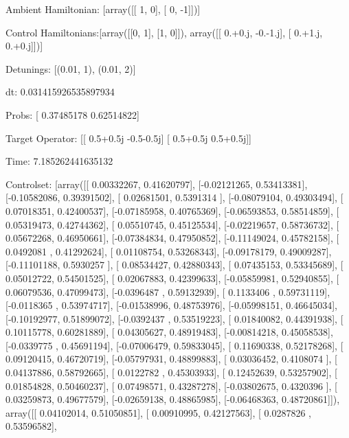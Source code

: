 \documentclass{article}
\begin{document}
    

\newpage

Ambient Hamiltonian: [array([[ 1,  0],
       [ 0, -1]])]

Control Hamiltonians:[array([[0, 1],
       [1, 0]]), array([[ 0.+0.j, -0.-1.j],
       [ 0.+1.j,  0.+0.j]])]

Detunings: [(0.01, 1), (0.01, 2)]

 dt: 0.031415926535897934

Probs: [ 0.37485178  0.62514822]

Target Operator: [[ 0.5+0.5j -0.5-0.5j]
 [ 0.5+0.5j  0.5+0.5j]]

Time: 7.185262441635132

Controlset: [array([[ 0.00332267,  0.41620797],
       [-0.02121265,  0.53413381],
       [-0.10582086,  0.39391502],
       [ 0.02681501,  0.5391314 ],
       [-0.08079104,  0.49303494],
       [ 0.07018351,  0.42400537],
       [-0.07185958,  0.40765369],
       [-0.06593853,  0.58514859],
       [ 0.05319473,  0.42744362],
       [ 0.05510745,  0.45125534],
       [-0.02219657,  0.58736732],
       [ 0.05672268,  0.46950661],
       [-0.07384834,  0.47950852],
       [-0.11149024,  0.45782158],
       [ 0.0492081 ,  0.41292624],
       [ 0.01108754,  0.53268343],
       [-0.09178179,  0.49009287],
       [-0.11101188,  0.5930257 ],
       [ 0.08534427,  0.42880343],
       [ 0.07435153,  0.53345689],
       [ 0.05012722,  0.54501525],
       [ 0.02067883,  0.42399633],
       [-0.05859981,  0.52940855],
       [ 0.06079536,  0.47099473],
       [-0.0396487 ,  0.59132939],
       [ 0.1133406 ,  0.59731119],
       [-0.0118365 ,  0.53974717],
       [-0.01538996,  0.48753976],
       [-0.05998151,  0.46645034],
       [-0.10192977,  0.51899072],
       [-0.0392437 ,  0.53519223],
       [ 0.01840082,  0.44391938],
       [ 0.10115778,  0.60281889],
       [ 0.04305627,  0.48919483],
       [-0.00814218,  0.45058538],
       [-0.0339775 ,  0.45691194],
       [-0.07006479,  0.59833045],
       [ 0.11690338,  0.52178268],
       [ 0.09120415,  0.46720719],
       [-0.05797931,  0.48899883],
       [ 0.03036452,  0.4108074 ],
       [ 0.04137886,  0.58792665],
       [ 0.0122782 ,  0.45303933],
       [ 0.12452639,  0.53257902],
       [ 0.01854828,  0.50460237],
       [ 0.07498571,  0.43287278],
       [-0.03802675,  0.4320396 ],
       [ 0.03259873,  0.49677579],
       [-0.02659138,  0.48865985],
       [-0.06468363,  0.48720861]]), array([[ 0.04102014,  0.51050851],
       [ 0.00910995,  0.42127563],
       [ 0.0287826 ,  0.53596582],
\end{document}
